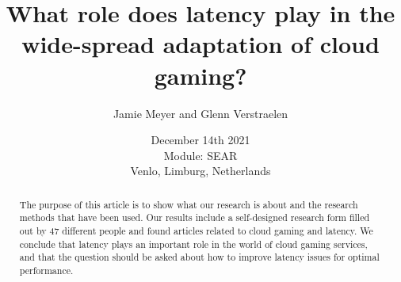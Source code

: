 \documentclass[]{report}
\title{What role does latency play in the wide-spread adaptation of cloud gaming?}
\author{Jamie Meyer and Glenn Verstraelen}
\date{December 14th 2021 \\Module: SEAR \\Venlo, Limburg, Netherlands}
\begin{document}
\maketitle

\begin{abstract}
The purpose of this article is to show what our research is about and the research methods that have been used. Our results include a self-designed research form filled out by 47 different people and found articles related to cloud gaming and latency. We conclude that latency plays an important role in the world of cloud gaming services, and that the question should be asked about how to improve latency issues for optimal performance. 
\end{abstract}

\tableofcontents
\setcounter{page}{3}
{%
	\let\oldnumberline\numberline%
	\renewcommand{\numberline}{\figurename~\oldnumberline}%
	\listoffigures%
}
\pagebreak
{}	
	
 
 
 
 

\printbibliography[title=References]

\appendix

\end{document}
